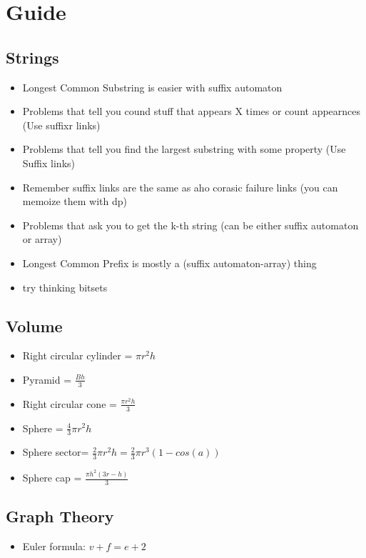 \section{Guide}
\vspace{-3pt}
\subsection{Strings}
\vspace{-3pt}
\begin{itemize}
\itemsep -5pt
\item Longest Common Substring is easier with suffix automaton
\item Problems that tell you cound stuff that appears X times or count appearnces (Use suffixr links)
\item Problems that tell you find the largest substring with some property (Use Suffix links)
\item Remember suffix links are the same as aho corasic failure links (you can memoize them with dp)
\item Problems that ask you to get the k-th string (can be either suffix automaton or array)
\item Longest Common Prefix is mostly a (suffix automaton-array) thing
\item try thinking bitsets
\end{itemize}
\vspace{-15pt}
\hrulefill 
\vspace{-15pt}
\vspace{-3pt}\subsection{Volume}\vspace{-3pt}
\begin{itemize}
\itemsep -5pt
\item Right circular cylinder = $\pi r^2 h$ 
\item Pyramid = $\frac{Bh}{3}$
\item Right circular cone = $\frac{\pi r^2 h}{3}$
\item Sphere = $\frac{4}{3} \pi r^2 h$
\item Sphere sector= $\frac{2}{3} \pi r^2h = \frac{2}{3} \pi r^3 (1-cos(a))$
\item Sphere cap = $\frac{\pi h^2 (3r-h)}{3}$
\end{itemize}
\vspace{-15pt}
\hrulefill 
\vspace{-15pt}
\vspace{-3pt}\subsection{Graph Theory}\vspace{-3pt}
\begin{itemize}
\itemsep -5pt
\item Euler formula: $v+f = e+2$
\end{itemize}
\vspace{-15pt}
\hrulefill 
\vspace{-15pt}


